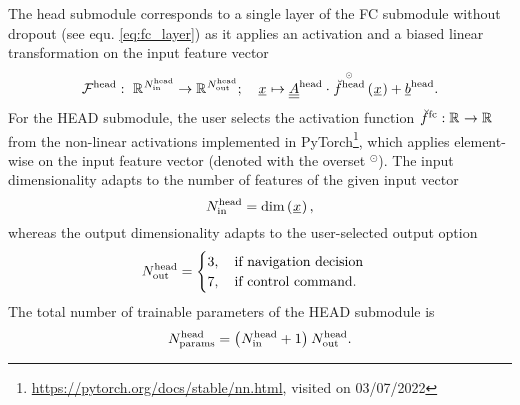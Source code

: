 The head submodule
corresponds to a single layer of the FC submodule
without dropout (see equ. \ref{eq:fc_layer})
as it
applies an activation and a biased linear transformation on the
input feature vector
\begin{align} \label{eq:head}
    \headMap
    :\ 
    \R{\headIn}
    \rightarrow 
    \R{\headOut}
    ;\quad 
    \featvec[]{}{}{}{}
    \mapsto
    \headMat \cdot \hadfct{\headAct}\left(\featvec[]{}{}{}{}\right)
    + \headBias
    .
\end{align}
For the HEAD submodule, the user selects
the activation function $\fcAct : \R{} \rightarrow \R{}$
from the non-linear activations implemented in PyTorch\footnote{
        \url{https://pytorch.org/docs/stable/nn.html}, visited on 03/07/2022
    },
which applies element-wise on the input feature vector (denoted with the overset ${}^\odot$).
The input dimensionality adapts to the
number of features of the given input vector
\begin{equation}
    \headIn
    =
    \dim \left(\featvec[]{}{}{}{}\right),
\end{equation}
whereas the output dimensionality
adapts to the user-selected output option
\begin{equation}
    \headOut
    = 
    \begin{cases}
        3
        ,\quad 
        \text{if navigation decision} 
        \\
        7
        ,\quad 
        \text{if control command.} 
    \end{cases}
\end{equation}
The total number of trainable parameters of the HEAD submodule is
\begin{equation} \label{eq:head_param}
    \headParam = \left( \headIn + 1 \right) \headOut
    .
\end{equation}






%











